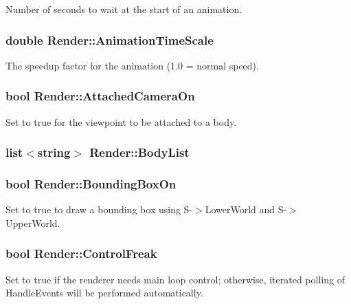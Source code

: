 Number of seconds to wait at the start of an animation.

\subsubsection{\setlength{\rightskip}{0pt plus 5cm}double Render::Animation\-Time\-Scale}\label{class_Render_m8}


The speedup factor for the animation (1.0 = normal speed).

\subsubsection{\setlength{\rightskip}{0pt plus 5cm}bool Render::Attached\-Camera\-On}\label{class_Render_m14}


Set to true for the viewpoint to be attached to a body.

\subsubsection{\setlength{\rightskip}{0pt plus 5cm}list$<$string$>$ Render::Body\-List\hspace{0.3cm}{\tt  [protected]}}\label{class_Render_n4}


\subsubsection{\setlength{\rightskip}{0pt plus 5cm}bool Render::Bounding\-Box\-On}\label{class_Render_m15}


Set to true to draw a bounding box using S-$>$Lower\-World and S-$>$Upper\-World.

\subsubsection{\setlength{\rightskip}{0pt plus 5cm}bool Render::Control\-Freak}\label{class_Render_m12}


Set to true if the renderer needs main loop control; otherwise, iterated polling of Handle\-Events will be performed automatically.

